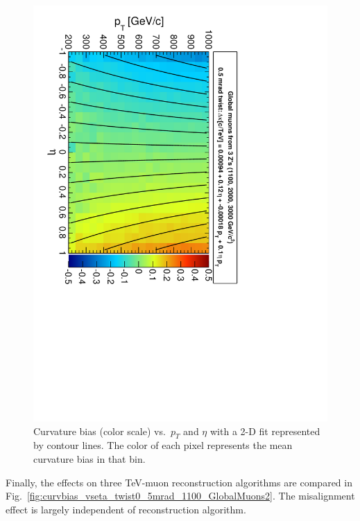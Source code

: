 \documentclass[12pt]{article}
\begin{document}
\begin{figure}
\includegraphics[height=\linewidth, angle=90]{trackdistort2d_twist0_5mrad_GlobalMuons2.pdf}
\caption{Curvature bias (color scale) vs.\ $p_T$ and $\eta$ with a 2-D
  fit represented by contour lines.  The color of each pixel
  represents the mean curvature bias in that
  bin. \label{fig:trackdistort2d_twist0_5mrad_GlobalMuons2}}
\end{figure}

Finally, the effects on three TeV-muon reconstruction algorithms are
compared in
Fig.~\ref{fig:curvbias_vseta_twist0_5mrad_1100_GlobalMuons2}.  The
misalignment effect is largely independent of reconstruction algorithm.
\end{document}
